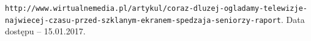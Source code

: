 \documentclass[12pt]{report}
\begin{document}
\begin{thebibliography}{99}
 {\tt http://www.wirtualnemedia.pl/artykul/coraz-dluzej-ogladamy\--telewizje-najwiecej-czasu-przed-szklanym-ekranem-spedzaja\--seniorzy-raport}. Data dostępu -- 15.01.2017.
\end{thebibliography}

\listoffigures

\listoftables

\lstlistoflistings
\end{document}
